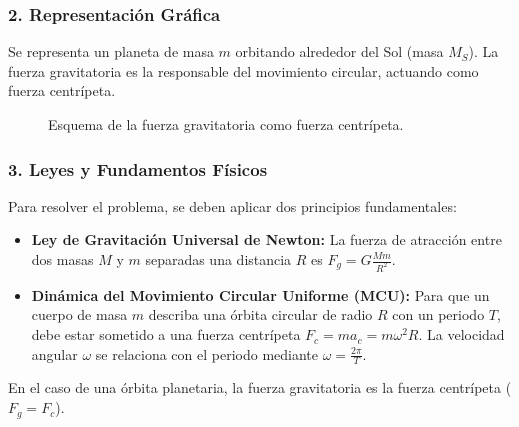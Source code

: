 \subsubsection*{2. Representación Gráfica}
Se representa un planeta de masa $m$ orbitando alrededor del Sol (masa $M_S$). La fuerza gravitatoria es la responsable del movimiento circular, actuando como fuerza centrípeta.
\begin{figure}[H]
    \centering
    \caption{Esquema de la fuerza gravitatoria como fuerza centrípeta.}
\end{figure}

\subsubsection*{3. Leyes y Fundamentos Físicos}
Para resolver el problema, se deben aplicar dos principios fundamentales:
\begin{itemize}
    \item \textbf{Ley de Gravitación Universal de Newton:} La fuerza de atracción entre dos masas $M$ y $m$ separadas una distancia $R$ es $F_g = G \frac{M m}{R^2}$.
    \item \textbf{Dinámica del Movimiento Circular Uniforme (MCU):} Para que un cuerpo de masa $m$ describa una órbita circular de radio $R$ con un periodo $T$, debe estar sometido a una fuerza centrípeta $F_c = m a_c = m \omega^2 R$. La velocidad angular $\omega$ se relaciona con el periodo mediante $\omega = \frac{2\pi}{T}$.
\end{itemize}
En el caso de una órbita planetaria, la fuerza gravitatoria es la fuerza centrípeta ($F_g = F_c$).

